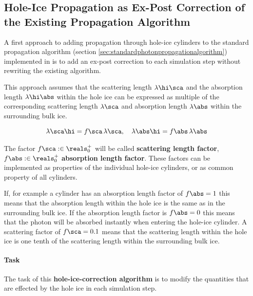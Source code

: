 
\subsection{Hole-Ice Propagation as Ex-Post Correction of the Existing Propagation Algorithm}
\label{sec:algorithm_a}


A first approach to adding propagation through hole-ice cylinders to the standard propagation algorithm (section \ref{sec:standardphotonpropagationalgorithm}) implemented in \clsim is to add an ex-post correction to each simulation step without rewriting the existing algorithm.


This approach assumes that the scattering length $\lambda\hi\sca$ and the absorption length $\lambda\hi\abs$ within the hole ice can be expressed as multiple of the corresponding scattering length $\lambda\sca$ and absorption length $\lambda\abs$ within the surrounding bulk ice.

$$
  \lambda\sca\hi = f\sca \, \lambda\sca, \ \ \ \lambda\abs\hi = f\abs \, \lambda\abs
$$

The factor $f\sca :\in \reals^+_0$ will be called \textbf{scattering length factor}, $f\abs :\in \reals^+_0$ \textbf{absorption length factor}. These factors can be implemented as properties of the individual hole-ice cylinders, or as common property of all cylinders.

If, for example a cylinder has an absorption length factor of $f\abs = 1$ this means that the absorption length within the hole ice is the same as in the surrounding bulk ice. If the absorption length factor is $f\abs = 0$ this means that the photon will be absorbed instantly when entering the hole-ice cylinder. A scattering factor of $f\sca=0.1$ means that the scattering length within the hole ice is one tenth of the scattering length within the surrounding bulk ice.

\paragraph{Task} The task of this \textbf{hole-ice-correction algorithm} is to modify the quantities that are effected by the hole ice in each simulation step.

